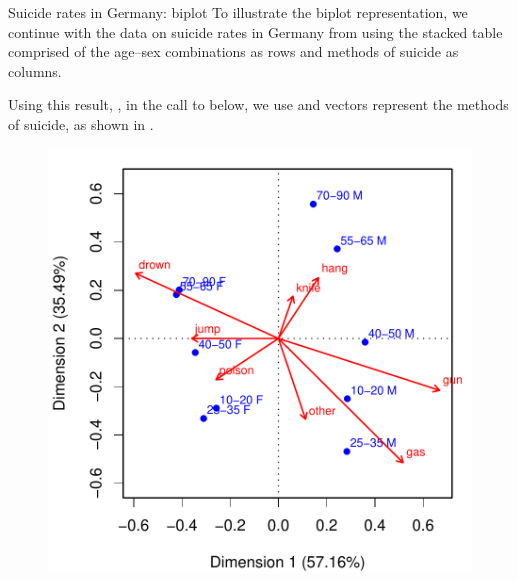 \documentclass[11pt]{book}
\renewenvironment{knitrout}{\small\renewcommand{\baselinestretch}{.85}}{} %
\begin{document}
\begin{Example}[suicide3]{Suicide rates in Germany: biplot}
To illustrate the biplot representation, we continue with the
data on suicide rates in Germany from 
using the stacked table  comprised of
the age--sex combinations as rows and methods of suicide as columns.

\begin{knitrout}
\color{fgcolor}\begin{kframe}
\begin{alltt}
 \hlkwb{<-}  \hlopt{~}  \hlopt{+}  
 \hlkwb{<-} 
\end{alltt}
\end{kframe}
\end{knitrout}
Using this result, ,
in the call to  below, we use  and vectors
represent the methods of suicide, as shown in .
\begin{knitrout}
\color{fgcolor}\begin{kframe}
\begin{alltt}
 \hlstd{=}\hlstd{,} \hlstd{=}\hlstd{(}\hlstd{,} \hlstd{))}
\end{alltt}
\end{kframe}\begin{figure}[!htb]


\centerline{\includegraphics[width=.8\textwidth]{ch06/fig/ca-suicide-biplot} }


\end{figure}
\end{knitrout}
\end{Example}
\end{document}
